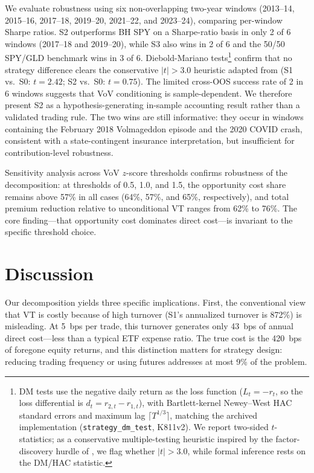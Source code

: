 \documentclass[12pt,a4paper]{article}
\begin{document}
We evaluate robustness using six non-overlapping two-year windows (2013--14, 2015--16, 2017--18, 2019--20, 2021--22, and 2023--24), comparing per-window Sharpe ratios. S2 outperforms BH SPY on a Sharpe-ratio basis in only 2 of 6 windows (2017--18 and 2019--20), while S3 also wins in 2 of 6 and the 50/50 SPY/GLD benchmark wins in 3 of 6. Diebold-Mariano tests\footnote{DM tests use the negative daily return as the loss function ($L_t = -r_t$, so the loss differential is $d_t = r_{2,t} - r_{1,t}$), with Bartlett-kernel Newey--West HAC standard errors and maximum lag $\lceil T^{1/3} \rceil$, matching the archived implementation (\texttt{strategy\_dm\_test}, K811v2).%
 We report two-sided $t$-statistics; as a conservative multiple-testing heuristic inspired by the factor-discovery hurdle of \citet{harvey2016}, we flag whether $|t| > 3.0$, while formal inference rests on the DM/HAC statistic.} confirm that no strategy difference clears the conservative $|t| > 3.0$ heuristic adapted from \citet{harvey2016} (S1 vs.\ S0: $t = 2.42$; S2 vs.\ S0: $t = 0.75$). The limited cross-OOS success rate of 2 in 6 windows suggests that VoV conditioning is sample-dependent. We therefore present S2 as a hypothesis-generating in-sample accounting result rather than a validated trading rule. The two wins are still informative: they occur in windows containing the February 2018 Volmageddon episode and the 2020 COVID crash, consistent with a state-contingent insurance interpretation, but insufficient for contribution-level robustness.

Sensitivity analysis across VoV $z$-score thresholds confirms robustness of the decomposition: at thresholds of 0.5, 1.0, and 1.5, the opportunity cost share remains above 57\% in all cases (64\%, 57\%, and 65\%, respectively), and total premium reduction relative to unconditional VT ranges from 62\% to 76\%. The core finding---that opportunity cost dominates direct cost---is invariant to the specific threshold choice.

\section{Discussion}
\label{sec:discussion}

Our decomposition yields three specific implications. First, the conventional view that VT is costly because of high turnover (S1's annualized turnover is 872\%) is misleading. At 5~bps per trade, this turnover generates only 43~bps of annual direct cost---less than a typical ETF expense ratio. The true cost is the 420~bps of foregone equity returns, and this distinction matters for strategy design: reducing trading frequency or using futures addresses at most 9\% of the problem.
\end{document}
